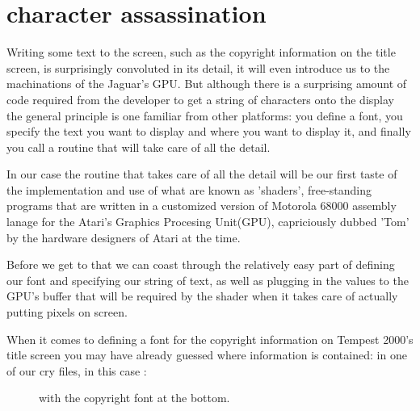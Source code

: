 \chapter{character assassination}
\label{sec:listing}
\lstset{style=6502Style}

Writing some text to the screen, such as the copyright information on the title screen, is surprisingly convoluted in its detail,
it will even introduce us to the machinations of the Jaguar's GPU. But although there is a surprising amount of code required from
the developer to get a string of characters onto the display the general principle is one familiar from other platforms: you define
a font, you specify the text you want to display and where you want to display it, and finally you call a routine that will take care of all the detail.

In our case the routine that takes care of all the detail will be our first taste of the implementation and use of what are known as 'shaders', free-standing
programs that are written in a customized version of Motorola 68000 assembly lanage for the Atari's Graphics Procesing Unit(GPU), capriciously dubbed 'Tom' by
the hardware designers of Atari at the time.

Before we get to that we can coast through the relatively easy part of defining our font and specifying our string of text, as well as plugging in the values
to the GPU's buffer that will be required by the shader when it takes care of actually putting pixels on screen.

When it comes to defining a font for the copyright information on Tempest 2000's title screen you may have already guessed where information is contained: in
one of our  cry files, in this case :

\begin{figure}[H]
    \centering
    \begin{adjustbox}{width=8cm,center}
    \end{adjustbox}
\caption{ with the copyright font at the bottom.}
\end{figure}

